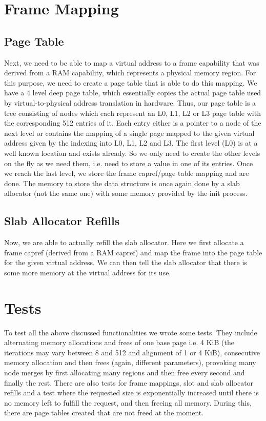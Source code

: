 \section{Frame Mapping}

\subsection{Page Table}
Next, we need to be able to map a virtual address to a frame capability that was
derived from a RAM capability, which represents a physical memory region.  For
this purpose, we need to create a page table that is able to do this mapping.  We
have a 4 level deep page table, which essentially copies the actual page table
used by virtual-to-physical address translation in hardware.
Thus, our page table is a tree consisting of nodes which each represent 
an L0, L1, L2 or L3 page table with the corresponding 512 entries of it.
Each entry either is a pointer to a node of the next level or contains the 
mapping of a single page mapped to the given virtual address given by the 
indexing into L0, L1, L2 and L3.
The first level (L0) is at a well known location and exists already. 
So we only need to create the other levels on the fly as we
need them, i.e. need to store a value in one of its entries.  Once we reach the
last level, we store the frame capref/page table mapping and are done. 
The memory to store the data structure is once again done by a slab allocator (not the same one) with some memory provided by the init process.

\subsection{Slab Allocator Refills}

Now, we are able to actually refill the slab allocator. Here we first allocate
a frame capref (derived from a RAM capref) and map the frame into the page table
for the given virtual address. We can then tell the slab allocator that there is
some more memory at the virtual address for its use.

\section{Tests}
To test all the above discussed functionalities we wrote some tests. They include
alternating memory allocations and frees of one base page i.e. 4 KiB (the
iterations may vary between 8 and 512 and alignment of 1 or 4 KiB), consecutive
memory allocation and then frees (again, different parameters), provoking many
node merges by first allocating many regions and then free every second and
finally the rest. There are also tests for frame mappings, slot and slab
allocator refills and a test where the requested size is exponentially increased
until there is no memory left to fulfill the request, and then freeing all
memory.  During this, there are page tables created that are not freed at the moment.

